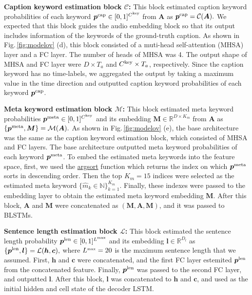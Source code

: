 \documentclass{article}
\begin{document}
\begin{sloppy}
\vspace{3pt}
\noindent
{\bf Caption keyword estimation block $\mathcal{C}$:}
This block estimated
caption keyword probabilities of each keyword
$\bm{p}^{\mbox{\scriptsize cap}} \in [0,1]^{ C^{\mbox{\tiny key}}}$ from $\bm{A}$ as
$
\bm{p}^{\mbox{\scriptsize cap}} 
= \mathcal{C}(  \bm{A} ).
$
We expected that this block guides the audio embedding block so that its output includes information of the keywords of the ground-truth caption.
As shown in Fig.\,\ref{fig:modelov} (d), this block consisted of a muti-head self-attention (MHSA) layer and a FC layer.
The number of heads of MHSA was 4.
The output shape of MHSA and FC layer were $D \times T_a$ and $C^{\mbox{\scriptsize key}} \times T_a$, respectively.
Since the caption keyword has no time-labels, we aggregated the output by taking a maximum value in the time direction and outputted caption keyword probabilities of each keyword $\bm{p}^{\mbox{\scriptsize cap}}$.



\vspace{3pt}
\noindent
{\bf Meta keyword estimation block $\mathcal{M}$:} 
This block estimated meta keyword probabilities $\bm{p}^{\mbox{\scriptsize meta}} \in [0,1]^{ C^{\mbox{\tiny key}}}$ and its embedding $\bm{M} \in \mathbb{R}^{ D \times K_m }$ from $\bm{A}$ as
$\{
\bm{p}^{\mbox{\scriptsize meta}}, \bm{M} \}
= \mathcal{M}(  \bm{A} ).
$
As shown in Fig.\,\ref{fig:modelov} (e), the base architecture was the same as the caption keyword estimation block, which consisted of MHSA and FC layers.
The base architecture outputted meta keyword probabilities of each keyword $\bm{p}^{\mbox{\scriptsize meta}}$.
To embed the estimated meta keywords into the feature space, first, we used the \url{argsort} function which returns the index on which $\bm{p}^{\mbox{\scriptsize meta}}$ sorts in descending order.
Then the top $K_m =15$ indices were selected as the estimated meta keyword $\{ \hat{m}_k \in \mathbb{N} \}_{k=1}^{K_m}$.
Finally, these indexes were passed to the embedding layer to obtain the estimated meta keyword embedding $\bm{M}$.
After this block, $\bm{A}$ and $\bm{M}$ were concatenated as $(\bm{M},\bm{A},\bm{M})$, and it was passed to BLSTMs.

\vspace{3pt}
\noindent
{\bf Sentence length estimation block $\mathcal{L}$:} 
This block estimated the sentence length probability $\bm{p}^{\mbox{\scriptsize len}} \in [0,1]^{ L^{\mbox{\tiny max}} }$ and its embedding $\bm{l} \in \mathbb{R}^{D_l}$ as
$\{ \bm{p}^{\mbox{\scriptsize len}}, \bm{l} \} = \mathcal{L}( \bm{h}, \bm{c} ),
$ where 
$L^{\mbox{\tiny max}} = 20$ is the maximum sentence length that we assumed.
First, $\bm{h}$ and $\bm{c}$ were concatenated, 
and the first FC layer estemited $\bm{p}^{\mbox{\scriptsize len}}$ from the concatenated feature.
Finally, $\bm{p}^{\mbox{\scriptsize len}}$ was passed to the second FC layer, and outputted $\bm{l}$.
After this block, $\bm{l}$ was concatenated to $\bm{h}$ and $\bm{c}$, and used as the initial hidden and cell state of the decoder LSTM.



\end{sloppy}
\end{document}
